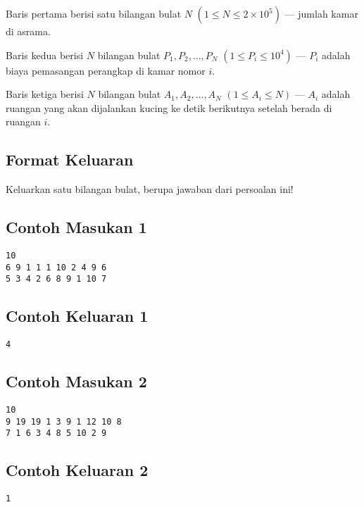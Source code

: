 \documentclass{article}
\begin{document}
Baris pertama berisi satu bilangan bulat $N$ $(1 \leq N \leq 2 \times 10^5)$ — jumlah kamar di asrama.

Baris kedua berisi $N$ bilangan bulat $P_1,P_2,\dots,P_N$ $(1 \leq P_i \leq 10^4)$ — $P_i$ adalah biaya pemasangan perangkap di kamar nomor $i$.

Baris ketiga berisi $N$ bilangan bulat $A_1,A_2,…,A_N$ $(1 \leq A_i \leq N)$ — $A_i$ adalah ruangan yang akan dijalankan kucing ke detik berikutnya setelah berada di ruangan $i$.

\subsection*{Format Keluaran}

Keluarkan satu bilangan bulat, berupa jawaban dari persoalan ini!
\\

\begin{multicols}{2}
\subsection*{Contoh Masukan 1}
\begin{lstlisting}
10
6 9 1 1 1 10 2 4 9 6
5 3 4 2 6 8 9 1 10 7
\end{lstlisting}
\columnbreak
\subsection*{Contoh Keluaran 1}
\begin{lstlisting}
4
\end{lstlisting}
\vfill
\null
\end{multicols}

\begin{multicols}{2}
\subsection*{Contoh Masukan 2}
\begin{lstlisting}
10
9 19 19 1 3 9 1 12 10 8
7 1 6 3 4 8 5 10 2 9
\end{lstlisting}
\columnbreak
\subsection*{Contoh Keluaran 2}
\begin{lstlisting}
1
\end{lstlisting}
\vfill
\null
\end{multicols}


\pagebreak
\end{document}
